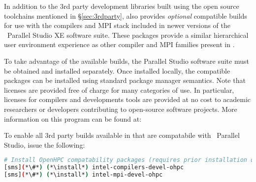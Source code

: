 In addition to the 3rd party development libraries built using the open source
toolchains mentioned in \S\ref{sec:3rdparty}, \OHPC{} also provides {\em
  optional} compatible builds for use with the compilers and MPI stack included
in newer versions of the \IntelR{}~Parallel Studio XE software suite.  These
packages provide a similar hierarchical user
environment experience as other compiler and MPI families present in \OHPC{}.

To take advantage of the available builds, the Parallel Studio software suite
must be obtained and installed separately. Once installed locally, the \OHPC{}
compatible packages can be installed using standard package manager semantics.
Note that licenses are provided free of charge for many categories of use. In
particular, licenses for compilers and developments tools are provided at no
cost to academic researchers or developers contributing to open-source software
projects. More information on this program can be found at:

\begin{center}
  \href{https://software.intel.com/en-us/qualify-for-free-software}
       {\color{blue}{https://software.intel.com/en-us/qualify-for-free-software}}
\end{center}

To enable all 3rd party builds available in \OHPC{} that are compatabile with
\IntelR{}~Parallel Studio, issue the following:

\begin{lstlisting}[language=bash,keywords={},upquote=true,keepspaces]
# Install OpenHPC compatability packages (requires prior installation of Parallel Studio
[sms](*\#*) (*\install*) intel-compilers-devel-ohpc
[sms](*\#*) (*\install*) intel-mpi-devel-ohpc
\end{lstlisting}


